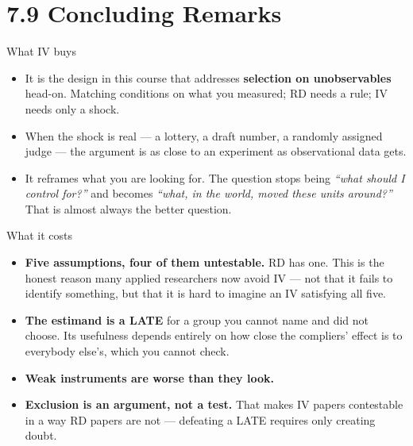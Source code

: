 \documentclass[
  11pt,
  ignorenonframetext,
  aspectratio=169,
]{beamer}
\providecommand{\tightlist}{%
  \setlength{\itemsep}{0pt}\setlength{\parskip}{0pt}}
\begin{document}
\section{7.9 Concluding Remarks}\label{concluding-remarks}

\begin{frame}{What IV buys}
\protect{}\label{what-iv-buys}
\begin{itemize}
\tightlist
\item
  It is the design in this course that addresses \textbf{selection on
  unobservables} head-on. Matching conditions on what you measured; RD
  needs a rule; IV needs only a shock.
\item
  When the shock is real --- a lottery, a draft number, a randomly
  assigned judge --- the argument is as close to an experiment as
  observational data gets.
\item
  It reframes what you are looking for. The question stops being
  \emph{``what should I control for?''} and becomes \emph{``what, in the
  world, moved these units around?''} That is almost always the better
  question.
\end{itemize}
\end{frame}

\begin{frame}{What it costs}
\protect{}\label{what-it-costs}
\begin{itemize}
\tightlist
\item
  \textbf{Five assumptions, four of them untestable.} RD has one. This
  is the honest reason many applied researchers now avoid IV --- not
  that it fails to identify something, but that it is hard to imagine an
  IV satisfying all five.
\item
  \textbf{The estimand is a LATE} for a group you cannot name and did
  not choose. Its usefulness depends entirely on how close the
  compliers' effect is to everybody else's, which you cannot check.
\item
  \textbf{Weak instruments are worse than they look.}
\item
  \textbf{Exclusion is an argument, not a test.} That makes IV papers
  contestable in a way RD papers are not --- defeating a LATE requires
  only creating doubt.
\end{itemize}
\end{frame}
\end{document}
